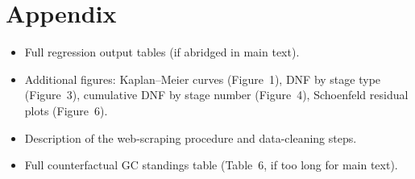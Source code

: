 \appendix
\section{Appendix}

\begin{itemize}
    \item Full regression output tables (if abridged in main text).
    \item Additional figures: Kaplan--Meier curves (Figure~1), DNF by stage type (Figure~3), cumulative DNF by stage number (Figure~4), Schoenfeld residual plots (Figure~6).
    \item Description of the web-scraping procedure and data-cleaning steps.
    \item Full counterfactual GC standings table (Table~6, if too long for main text).
\end{itemize}



